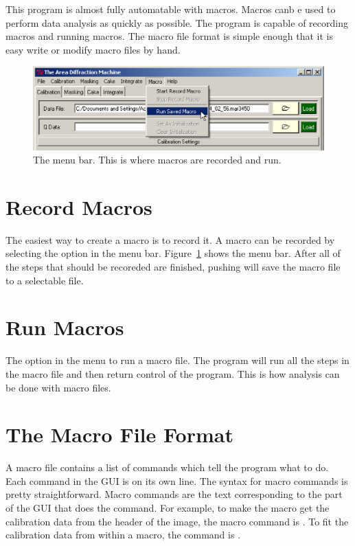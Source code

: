 This program is almost fully automatable with macros. Macros
canb e used to perform data analysis as quickly as possible. 
The program is capable of recording macros and running macros. 
The macro file format is simple enough that it is easy write 
or modify macro files by hand.

\begin{figure}
    \centering
    \includegraphics[scale=.75]{figures/macro.eps}
    \caption{The  menu bar. This is
    where macros are recorded and run.}
    \label{macro_figure}
\end{figure}

\section{Record Macros}

The easiest way to create a macro is to record it. A macro
can be recorded by selecting the  
option in the  menu 
bar. Figure~\ref{macro_figure} shows the  menu bar.
After all of the steps that should be recoreded are finished, 
pushing  will save the macro file to
a selectable file.

\section{Run Macros}

The  option in the 
menu to run a macro file. The program will run all the 
steps in the macro file and then return control of 
the program. This is how analysis can be done with
macro files.

\section{The Macro File Format}

A macro file contains a list of commands which tell the 
program what to do. Each command in the GUI is on its
own line. The syntax for macro commands is pretty 
straightforward. Macro commands are the 
text corresponding to the part of the GUI that does 
the command. For example, to make the macro get the 
calibration data from the header of the image, the macro 
command is . To fit the calibration
data from within a macro, the command is 
.

